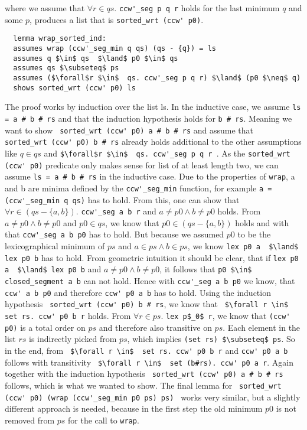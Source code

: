 where we assume that $\forall r \in  qs.$ \lstinline|ccw'_seg p q r| holds
for the last minimum $q$ and some $p$, produces a list that is \lstinline|sorted_wrt (ccw' p0)|.
\begin{lstlisting}
  lemma wrap_sorted_ind:
  assumes wrap (ccw'_seg_min q qs) (qs - {q}) = ls
  assumes q $\in$ qs  $\land$ p0 $\in$ qs
  assumes qs $\subseteq$ ps
  assumes ($\forall$r $\in$  qs. ccw'_seg p q r) $\land$ (p0 $\neq$ q)
  shows sorted_wrt (ccw' p0) ls
\end{lstlisting}
The proof works by induction over the list ls. In the inductive case, we 
assume \lstinline|ls = a # b # rs| and that the induction hypothesis holds for \lstinline|b # rs|.
Meaning we want to show  \lstinline| sorted_wrt (ccw' p0) a # b # rs| and assume that 
\lstinline| sorted_wrt (ccw' p0) b # rs| already holds additional to the other assumptions like
$q \in qs$ and \lstinline|$\forall$r $\in$  qs. ccw'_seg p q r |.
As the \lstinline|sorted_wrt (ccw' p0)|
predicate only makes sense for list of at least length two, we can assume 
\lstinline|ls = a # b # rs| in the inductive case.
Due to the properties of \lstinline|wrap|, a and b are minima defined by the 
\lstinline|ccw'_seg_min| function, for example \lstinline|a = (ccw'_seg_min q qs)| has 
to hold. From this, one can show that $\forall r \in  (qs - \{a,b\}).$ \lstinline|ccw'_seg a b r|
and $a \neq p0  \land  b \neq p0$  holds. From $a \neq p0  \land  b \neq p0$ and $p0 \in qs$,
we know that $p0 \in (qs - \{a,b\})$ holds and with that \lstinline|ccw'_seg a b p0| has to
hold. But because we assumed $p0$ to be the lexicographical minimum of $ps$ and 
$a \in ps  \land  b \in ps$, we know \lstinline|lex p0 a  $\land$ lex p0 b| has to hold.
From geometric intuition it should be clear, that if \lstinline|lex p0 a  $\land$ lex p0 b|
and $a \neq p0  \land  b \neq p0$, it follows that \lstinline|p0 $\in$ closed_segment a b| can not hold. 
Hence with \lstinline|ccw'_seg a b p0| we know, that \lstinline|ccw' a b p0|
and therefore \lstinline|ccw' p0 a b| has to hold. Using the induction hypothesis 
\lstinline| sorted_wrt (ccw' p0) b # rs|, we know that \lstinline| $\forall r \in$  set rs. ccw' p0 b r|
holds. From $\forall r \in ps.$ \lstinline|lex p$_0$ r|, we know that \lstinline|(ccw' p0)| is 
a total order on $ps$ and therefore also transitive on $ps$. Each element in the list $rs$ is 
indirectly picked from $ps$, which implies \lstinline|(set rs) $\subseteq$ ps|.
So in the end, from \lstinline| $\forall r \in$  set rs. ccw' p0 b r| and \lstinline|ccw' p0 a b|
follows with transitivity \lstinline| $\forall r \in$  set (b#rs). ccw' p0 a r|. Again
together with the induction hypothesis \lstinline| sorted_wrt (ccw' p0) a # b # rs| follows,
which is what we wanted to show.
The final lemma for \lstinline| sorted_wrt (ccw' p0) (wrap (ccw'_seg_min p0 ps) ps) | works
very similar, but a slightly different approach is needed, because in the first step the 
old minimum $p0$  is not removed from $ps$ for the call to \lstinline|wrap|.

